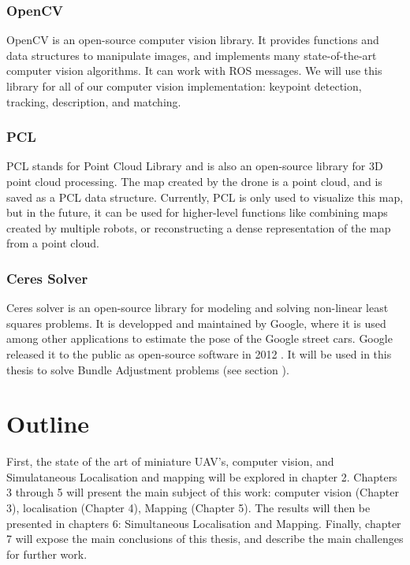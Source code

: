 \subsubsection{OpenCV}
OpenCV is an open-source computer vision library. It provides functions and data structures to manipulate images, and implements many state-of-the-art computer vision algorithms. It can work with ROS messages. We will use this library for all of our computer vision implementation: keypoint detection, tracking, description, and matching.

\subsubsection{PCL}
PCL stands for Point Cloud Library and is also an open-source library for 3D point cloud processing. The map created by the drone is a point cloud, and is saved as a PCL data structure. Currently, PCL is only used to visualize this map, but in the future, it can be used for higher-level functions like combining maps created by multiple robots, or reconstructing a dense representation of the map from a point cloud.

\subsubsection{Ceres Solver}
Ceres solver \cite{ceres-solver} is an open-source library for modeling and solving non-linear least squares problems. It is developped and maintained by Google, where it is used among other applications to estimate the pose of the Google street cars. Google released it to the public as open-source software in 2012 \cite{introducingceres}. It will be used in this thesis to solve Bundle Adjustment problems (see section ).%


\section{Outline}
First, the state of the art of miniature UAV's, computer vision, and Simulataneous Localisation and mapping will be explored in chapter 2. Chapters 3 through 5 will present the main subject of this work: computer vision (Chapter 3), localisation (Chapter 4), Mapping (Chapter 5). The results will then be presented in chapters 6: Simultaneous Localisation and Mapping. Finally, chapter 7 will expose the main conclusions of this thesis, and describe the main challenges for further work.
